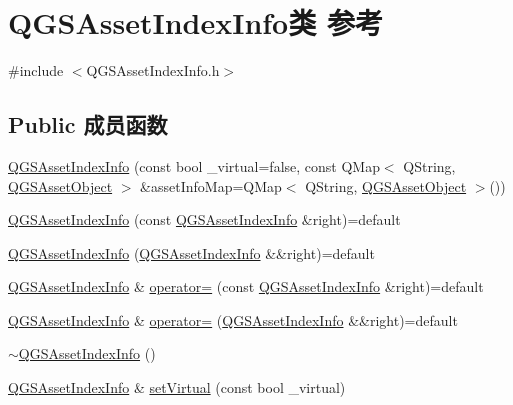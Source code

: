 \hypertarget{class_q_g_s_asset_index_info}{}\section{Q\+G\+S\+Asset\+Index\+Info类 参考}
\label{class_q_g_s_asset_index_info}


{\ttfamily \#include $<$Q\+G\+S\+Asset\+Index\+Info.\+h$>$}

\subsection*{Public 成员函数}
\begin{DoxyCompactItemize}
\item 
\mbox{\hyperlink{class_q_g_s_asset_index_info_aca7f21cac633e8d04e5ae59e6b1ea275}{Q\+G\+S\+Asset\+Index\+Info}} (const bool \+\_\+virtual=false, const Q\+Map$<$ Q\+String, \mbox{\hyperlink{class_q_g_s_asset_object}{Q\+G\+S\+Asset\+Object}} $>$ \&asset\+Info\+Map=Q\+Map$<$ Q\+String, \mbox{\hyperlink{class_q_g_s_asset_object}{Q\+G\+S\+Asset\+Object}} $>$())
\item 
\mbox{\hyperlink{class_q_g_s_asset_index_info_aaf35334a512a447eba1bdbffa58ea485}{Q\+G\+S\+Asset\+Index\+Info}} (const \mbox{\hyperlink{class_q_g_s_asset_index_info}{Q\+G\+S\+Asset\+Index\+Info}} \&right)=default
\item 
\mbox{\hyperlink{class_q_g_s_asset_index_info_a9dd3a9731fe9d4cdde644522a5d65b55}{Q\+G\+S\+Asset\+Index\+Info}} (\mbox{\hyperlink{class_q_g_s_asset_index_info}{Q\+G\+S\+Asset\+Index\+Info}} \&\&right)=default
\item 
\mbox{\hyperlink{class_q_g_s_asset_index_info}{Q\+G\+S\+Asset\+Index\+Info}} \& \mbox{\hyperlink{class_q_g_s_asset_index_info_aea5f4688c644ab48b28aa4aece3fd286}{operator=}} (const \mbox{\hyperlink{class_q_g_s_asset_index_info}{Q\+G\+S\+Asset\+Index\+Info}} \&right)=default
\item 
\mbox{\hyperlink{class_q_g_s_asset_index_info}{Q\+G\+S\+Asset\+Index\+Info}} \& \mbox{\hyperlink{class_q_g_s_asset_index_info_a3d55ef03fba70e2f956771e87d8f45c5}{operator=}} (\mbox{\hyperlink{class_q_g_s_asset_index_info}{Q\+G\+S\+Asset\+Index\+Info}} \&\&right)=default
\item 
\mbox{\hyperlink{class_q_g_s_asset_index_info_a5128d646c3deb216907f4ea522fa68d9}{$\sim$\+Q\+G\+S\+Asset\+Index\+Info}} ()
\item 
\mbox{\hyperlink{class_q_g_s_asset_index_info}{Q\+G\+S\+Asset\+Index\+Info}} \& \mbox{\hyperlink{class_q_g_s_asset_index_info_acd496b4b2aae04737335a6bdb9958938}{set\+Virtual}} (const bool \+\_\+virtual)

\end{DoxyCompactItemize}
